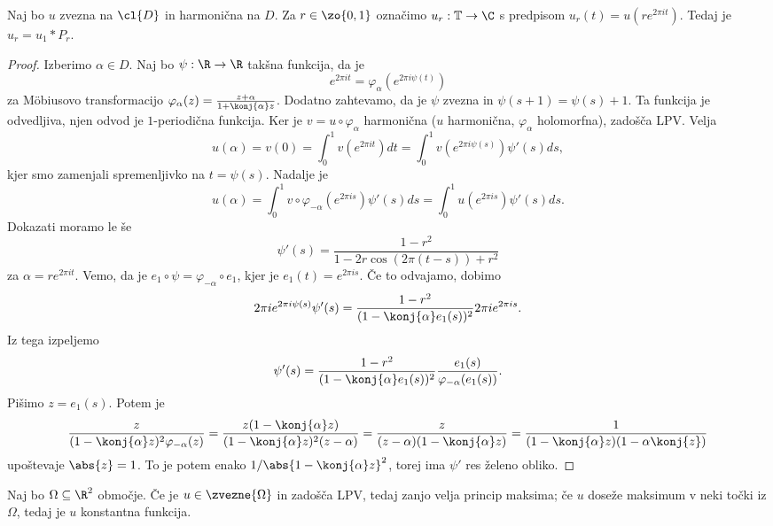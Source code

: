 
\begin{izrek}
  Naj bo $u$ zvezna na $\cl{D}$ in harmonična na $D$.
  Za $r \in \zo{0,1}$ označimo $u_r: \mathbb{T} \to \C$ s predpisom $u_r(t) =
  u(r e^{2 \pi i t})$.
  Tedaj je $u_r = u_1 * P_r$.
\end{izrek}

\begin{proof}
  Izberimo $\alpha \in D$.
  Naj bo $\psi: \R \to \R$ takšna funkcija, da je
  \[
	e^{2 \pi i t} = \varphi_\alpha(e^{2 \pi i \psi(t)})
  \]
  za Möbiusovo transformacijo $\varphi_\alpha(z) = \frac{z+\alpha}{1 +
	\konj{\alpha}z}$.
  Dodatno zahtevamo, da je $\psi$ zvezna in $\psi(s+1) = \psi(s)+1$.
  Ta funkcija je odvedljiva, njen odvod je $1$-periodična funkcija.
  Ker je $v = u \circ \varphi_\alpha$ harmonična ($u$ harmonična,
  $\varphi_\alpha$ holomorfna), zadošča LPV.
  Velja
  \[
	u(\alpha) = v(0)
	= \int_0^1 v(e^{2 \pi i t}) dt
	= \int_0^1 v(e^{2 \pi i \psi(s)}) \psi'(s) ds,
  \]
  kjer smo zamenjali spremenljivko na $t = \psi(s)$.
  Nadalje je
  \[
	u(\alpha)
	= \int_0^1 v \circ \varphi_{-\alpha}(e^{2 \pi i s}) \psi'(s) ds
	= \int_0^1 u(e^{2 \pi i s}) \psi'(s) ds.
  \]
  Dokazati moramo le še
  \[
	\psi'(s) = \frac{1-r^2}{1 - 2r \cos(2 \pi (t-s)) + r^2}
  \]
  za $\alpha = r e^{2 \pi i t}$.
  Vemo, da je $e_1 \circ \psi = \varphi_{-\alpha} \circ e_1$, kjer je $e_1(t) =
  e^{2 \pi i s}$.
  Če to odvajamo, dobimo
  \[
	2 \pi i e^{2 \pi i \psi(s)} \psi'(s) = \frac{1 - r^2}{(1 - \konj{\alpha}
	  e_1(s))^2} 2 \pi i e^{2 \pi i s}.
  \]
  Iz tega izpeljemo
  \[
	\psi'(s) = \frac{1 - r^2}{(1 - \konj{\alpha} e_1(s))^2}
	\frac{e_1(s)}{\varphi_{-\alpha}(e_1(s))}.
  \]
  Pišimo $z = e_1(s)$.
  Potem je
  \[
	\frac{z}{(1 - \konj{\alpha} z)^2 \varphi_{-\alpha}(z)}
	= \frac{z (1 - \konj{\alpha} z)}{(1 - \konj{\alpha} z)^2 (z - \alpha)}
	= \frac{z}{(z-\alpha)(1 - \konj{\alpha} z)}
	= \frac{1}{(1 - \konj{\alpha} z)(1 - \alpha \konj{z})}
  \]
  upoštevaje $\abs{z} = 1$.
  To je potem enako $1 / \abs{1 - \konj{\alpha}z}^2$, torej ima $\psi'$ res
  želeno obliko.
\end{proof}


\begin{lema}
  Naj bo $\Omega \subseteq \R^2$ območje.
  Če je $u \in \zvezne{\Omega}$ in zadošča LPV, tedaj zanjo velja princip
  maksima; če $u$ doseže maksimum v neki točki iz $\Omega$, tedaj je $u$
  konstantna funkcija.
\end{lema}

